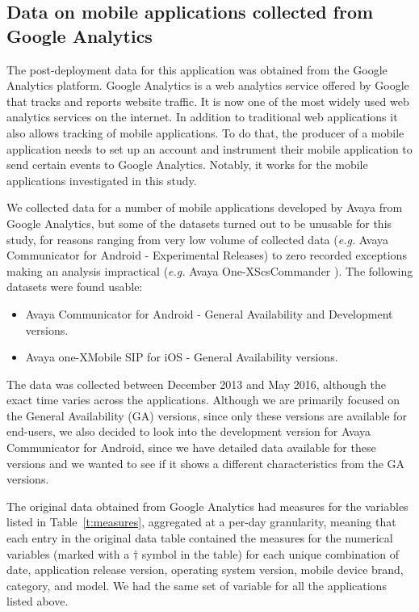 \documentclass[smallextended]{svjour3}       %
\begin{document}
\subsection{Data on mobile applications collected from Google Analytics}
The post-deployment data for this application was obtained from the 
Google Analytics platform.
Google Analytics is a web analytics service offered by
Google that tracks and reports website traffic. It is now one of the most
widely used web analytics services on the internet. In addition to
traditional web applications it also allows tracking of mobile
applications. To do that, the producer of a mobile application needs
to set up an account and instrument their mobile application to send certain
events to Google Analytics. Notably, it works for the mobile
applications investigated in this study. 

We collected data for a number of mobile applications developed by Avaya from Google Analytics, but some of the datasets turned out to be unusable for this study, for reasons ranging from very low volume of collected data (\textit{e.g.} Avaya Communicator for Android - Experimental Releases) to zero recorded exceptions making an analysis impractical (\textit{e.g.} Avaya One-X\textregistered   ScsCommander ). The following datasets were found usable:
\begin{itemize}
    \item Avaya Communicator for Android - General Availability and Development versions.
    \item Avaya one-X\textregistered Mobile  SIP  for  iOS - General Availability versions.
\end{itemize}

The data was collected between December 2013 and May 2016, although the exact time varies across the applications. Although we are primarily focused on the General Availability (GA) versions, since only these versions are available for end-users, we also decided to look into the development version for Avaya Communicator for Android, since we have detailed data available for these versions and we wanted to see if it shows a different characteristics from the GA versions.  

The original data obtained from Google Analytics had measures for the variables 
listed in Table~\ref{t:measures}, aggregated at a per-day granularity, meaning 
that each entry in the original data table contained the measures for the numerical 
variables (marked with a $\dagger$ symbol in the table) for each unique combination
of date, application release version, operating system version, mobile device brand, 
category, and model. We had the same set of variable for all the applications listed above.
\end{document}
